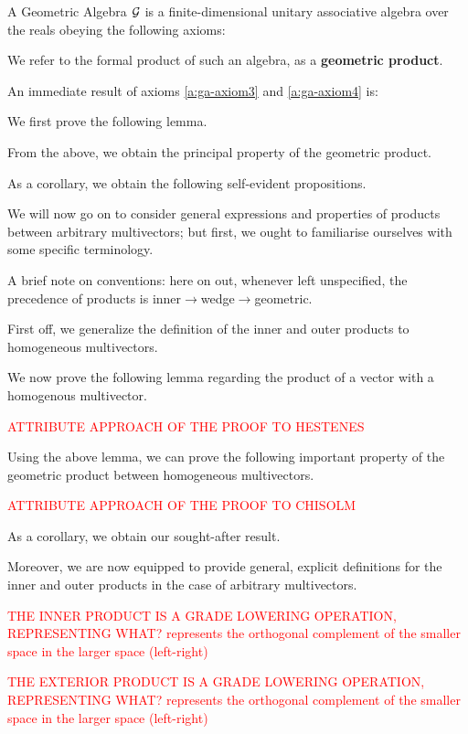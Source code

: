 A Geometric Algebra $\mathcal{G}$  is a finite-dimensional unitary associative algebra over the reals obeying the following axioms:

We refer to the formal product of such an algebra, as a \textbf{geometric product}.

An immediate result of axioms \ref{a:ga-axiom3} and \ref{a:ga-axiom4} is:


We first prove the following lemma.



From the above, we obtain the principal property of the geometric product.



As a corollary, we obtain the following self-evident propositions.



We will now go on to consider general expressions and properties of products between arbitrary multivectors; but first, we ought to familiarise ourselves with some specific terminology.

A brief note on conventions: here on out, whenever left unspecified, the precedence of products is inner$\to$wedge$\to$geometric.

First off, we generalize the definition of the inner and outer products to homogeneous multivectors.



We now prove the following lemma regarding the product of a vector with a homogenous multivector.



\textcolor{red}{ATTRIBUTE APPROACH OF THE PROOF TO HESTENES}

Using the above lemma, we can prove the following important property of the geometric product between homogeneous multivectors.



\textcolor{red}{ATTRIBUTE APPROACH OF THE PROOF TO CHISOLM}

As a corollary, we obtain our sought-after result.



Moreover, we are now equipped to provide general, explicit definitions for the inner and outer products in the case of arbitrary multivectors.

\textcolor{red}{THE INNER PRODUCT IS A GRADE LOWERING OPERATION, REPRESENTING WHAT? represents the orthogonal complement of the smaller space in the larger space (left-right)}

\textcolor{red}{THE EXTERIOR PRODUCT IS A GRADE LOWERING OPERATION, REPRESENTING WHAT? represents the orthogonal complement of the smaller space in the larger space (left-right)}

